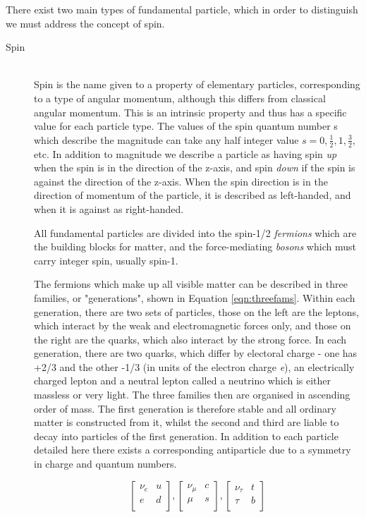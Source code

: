 There exist two main types of fundamental particle, which in order to distinguish we must address the concept of spin. 
\begin{description}
\item[Spin] \hfill \\
Spin is the name given to a property of elementary particles, corresponding to a type of angular momentum, although this differs from classical angular momentum. This is an intrinsic property and thus has a specific value for each particle type. The values of the spin quantum number s which describe the magnitude can take any half integer value $s=0, \frac{1}{2}, 1, \frac{3}{2}$, etc. In addition to magnitude we describe a particle as having spin \textit{up} when the spin is in the direction of the z-axis, and spin \textit{down} if the spin is against the direction of the z-axis. When the spin direction is in the direction of momentum of the particle, it is described as left-handed, and when it is against as right-handed. 

All fundamental particles are divided into the spin-1/2 \textit{fermions} which are the building blocks for matter, and the force-mediating \textit{bosons} which must carry integer spin, usually spin-1. 
 

 
The fermions which make up all visible matter can be described in three families, or "generations", shown in Equation \ref{eqn:threefams}. Within each generation, there are two sets of particles, those on the left are the leptons, which interact by the weak and electromagnetic forces only, and those on the right are the quarks, which also interact by the strong force. In each generation, there are two quarks, which differ by electoral charge - one has +2/3 and the other -1/3 (in units of the electron charge \textit{e}), an electrically charged lepton and a neutral lepton called a neutrino which is either massless or very light. The three families then are organised in ascending order of mass. The first generation is therefore stable and all ordinary matter is constructed from it, whilst the second and third are liable to decay into particles of the first generation. In addition to each particle detailed here there exists a corresponding antiparticle due to a symmetry in charge and quantum numbers.  

\begin{equation}
\begin{bmatrix}
\nu_{e} & u \\
e & d \\
\end{bmatrix},
\begin{bmatrix}
\nu_{\mu} & c \\
\mu & s \\
\end{bmatrix},
\begin{bmatrix}
\nu_{\tau} & t \\
\tau & b\\
\end{bmatrix}
\label{eqn:threefams}
\end{equation}


\end{description}
